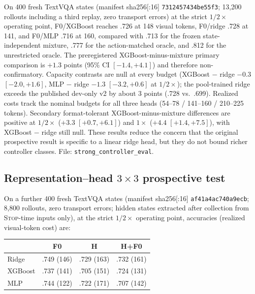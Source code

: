 \documentclass[10pt]{article}
\begin{document}
On 400 fresh TextVQA states (manifest sha256[:16] \texttt{7312457434be55f3};
13,200 rollouts including a third replay, zero transport errors) at the
strict $1/2\times$ operating point, F0/XGBoost reaches .726 at 148 visual
tokens, F0/ridge .728 at 141, and F0/MLP .716 at 160, compared with .713 for
the frozen state-independent mixture, .777 for the action-matched oracle,
and .812 for the unrestricted oracle. The preregistered XGBoost-minus-mixture
primary comparison is $+1.3$ points (95\% CI $[-1.4, +4.1]$) and therefore
non-confirmatory. Capacity contrasts are null at every budget (XGBoost
$-$ ridge $-0.3$ $[-2.0, +1.6]$, MLP $-$ ridge $-1.3$ $[-3.2, +0.6]$ at
$1/2\times$); the pool-trained ridge exceeds the published dev-only v2 by
about 3 points (.728 vs.\ .699). Realized costs track the nominal budgets for
all three heads (54--78 / 141--160 / 210--225 tokens). Secondary
format-tolerant XGBoost-minus-mixture differences are positive at
$1/2\times$ ($+3.3$ $[+0.7, +6.1]$) and $1\times$ ($+4.4$ $[+1.4, +7.5]$),
with XGBoost $-$ ridge still null. These results reduce the concern that
the original prospective result is specific to a linear ridge head, but
they do not bound richer controller classes. File:
\texttt{strong\_controller\_eval}.

\subsection{Representation--head $3\times3$ prospective test}
\label{sec:results:hidden}

On a further 400 fresh TextVQA states (manifest sha256[:16]
\texttt{af41a4ac740a9ecb}; 8,800 rollouts, zero transport errors; hidden
states extracted after collection from \textsc{Stop}-time inputs only), at
the strict $1/2\times$ operating point, accuracies (realized visual-token
cost) are:

\begin{center}
\small
\begin{tabular}{lccc}
\toprule
& F0 & H & H+F0 \\
\midrule
Ridge   & .749 (146) & .729 (163) & .732 (161) \\
XGBoost & .737 (141) & .705 (151) & .724 (131) \\
MLP     & .744 (122) & .722 (171) & .707 (142) \\
\bottomrule
\end{tabular}
\end{center}
\end{document}
